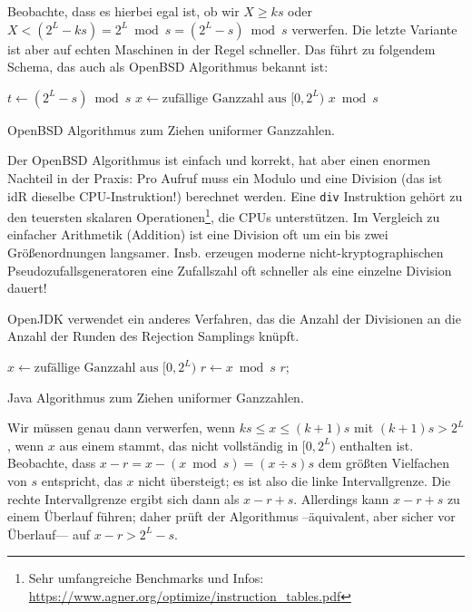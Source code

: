 Beobachte, dass es hierbei egal ist, ob wir $X \ge ks$ oder $X < (2^L - ks) = 2^L \bmod s = (2^L -s) \bmod s$ verwerfen.
Die letzte Variante ist aber auf echten Maschinen in der Regel schneller.
Das führt zu folgendem Schema, das auch als OpenBSD Algorithmus bekannt ist:

\begin{algorithm}[H]
    $t \gets (2^L - s) \bmod s$
    $x \gets \text{zufällige Ganzzahl aus $[0, 2^L)$}$\;
    \While{x < t}{
    $x \gets \text{zufällige Ganzzahl aus $[0, 2^L)$}$\;
    }
    \Return $x \bmod s$\;
    \caption{OpenBSD Algorithmus zum Ziehen uniformer Ganzzahlen.}
\end{algorithm}

Der OpenBSD Algorithmus ist einfach und korrekt, hat aber einen enormen Nachteil in der Praxis:
Pro Aufruf muss ein Modulo und eine Division (das ist idR dieselbe CPU-Instruktion!) berechnet werden.
Eine \texttt{div} Instruktion gehört zu den teuersten skalaren Operationen\footnote{Sehr umfangreiche Benchmarks und Infos: \url{https://www.agner.org/optimize/instruction_tables.pdf}}, die CPUs unterstützen.
Im Vergleich zu einfacher Arithmetik (\zB Addition) ist eine Division oft um ein bis zwei Größenordnungen langsamer.
Insb. erzeugen moderne nicht-kryptographischen Pseudozufallsgeneratoren eine Zufallszahl oft schneller als eine einzelne Division dauert!

OpenJDK verwendet ein anderes Verfahren, das die Anzahl der Divisionen an die Anzahl der Runden des Rejection Samplings knüpft.

\begin{algorithm}[H]
    $x \gets \text{zufällige Ganzzahl aus $[0, 2^L)$}$\;
    $r \gets x \bmod s$\;
    \While{$x - r > 2^L - s$}{
    $x \gets \text{zufällige Ganzzahl aus $[0, 2^L)$}$\;
    $r \gets x \bmod s$\;
    }
    \Return $r$;
    \caption{Java Algorithmus zum Ziehen uniformer Ganzzahlen.}
\end{algorithm}

Wir müssen genau dann verwerfen, wenn $ks \le x \le (k+1)s$ mit $(k+1)s > 2^L$, \dh wenn $x$ aus einem  stammt, das nicht vollständig in $[0, 2^L)$ enthalten ist.
Beobachte, dass $x - r = x - (x \bmod s) = (x \div s)s$ dem größten Vielfachen von $s$ entspricht, das $x$ nicht übersteigt;
es ist also die linke Intervallgrenze.
Die rechte Intervallgrenze ergibt sich dann als $x- r +s$.
Allerdings kann $x - r + s$ zu einem Überlauf führen; daher prüft der Algorithmus --äquivalent, aber sicher vor Überlauf--- auf $x - r > 2^L - s$.

